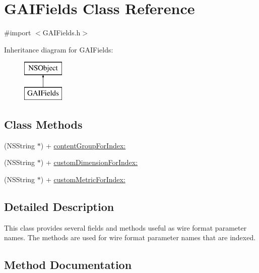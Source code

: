\hypertarget{interface_g_a_i_fields}{}\section{G\+A\+I\+Fields Class Reference}
\label{interface_g_a_i_fields}


{\ttfamily \#import $<$G\+A\+I\+Fields.\+h$>$}

Inheritance diagram for G\+A\+I\+Fields\+:\begin{figure}[H]
\begin{center}
\leavevmode
\includegraphics[height=2.000000cm]{interface_g_a_i_fields}
\end{center}
\end{figure}
\subsection*{Class Methods}
\begin{DoxyCompactItemize}
\item 
(N\+S\+String $\ast$) + \hyperlink{interface_g_a_i_fields_af5eaaaa590806866ee011dd981f0b81a}{content\+Group\+For\+Index\+:}
\item 
(N\+S\+String $\ast$) + \hyperlink{interface_g_a_i_fields_a70d997a1372757a3f5b243d7274a73dd}{custom\+Dimension\+For\+Index\+:}
\item 
(N\+S\+String $\ast$) + \hyperlink{interface_g_a_i_fields_a2f02ddf6c9e6055ef41af6f1b98d872e}{custom\+Metric\+For\+Index\+:}
\end{DoxyCompactItemize}


\subsection{Detailed Description}
This class provides several fields and methods useful as wire format parameter names. The methods are used for wire format parameter names that are indexed. 

\subsection{Method Documentation}
\mbox{\label{interface_g_a_i_fields_af5eaaaa590806866ee011dd981f0b81a}} 

